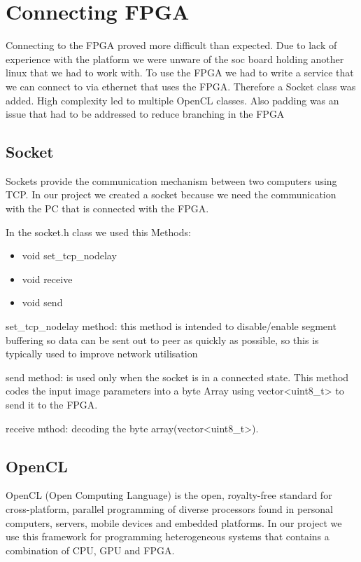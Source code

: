 \documentclass[parskip=full]{scrartcl}
\begin{document}
	
\pagebreak

\section{Connecting FPGA} \label{Connecting FPGA}

Connecting to the FPGA proved more difficult than expected. Due to lack of experience with the platform we were unware of the soc board holding another linux that we had to work with. To use the FPGA we had to write a service that we can connect to via ethernet that uses the FPGA. Therefore a Socket class was added. High complexity led to multiple OpenCL classes. Also padding was an issue that had to be addressed to reduce branching in the FPGA

\subsection{Socket}

Sockets provide the communication mechanism between two computers using TCP. In our project we created a socket because we need the communication with the PC that is connected with the FPGA. 

In the socket.h class we used this Methods:

\begin {itemize}
	\item void set\_tcp\_nodelay
	\item void receive
	\item void send
\end{itemize}

set\_tcp\_nodelay method: this method is intended to disable/enable segment buffering so data can be sent out to peer as quickly as possible, so this is typically used to improve network utilisation

send method:  is used only when the socket is in a connected state. This method codes the input image parameters into a byte Array using vector<uint8\_t> to send it to the FPGA.

receive mthod: decoding the byte array(vector<uint8\_t>).

\pagebreak

\subsection{OpenCL}

OpenCL (Open Computing Language) is the open, royalty-free standard for cross-platform, parallel programming of diverse processors found in personal computers, servers, mobile devices and embedded platforms. In our project we use this framework for programming heterogeneous systems that contains a combination of CPU, GPU and FPGA.
\end{document}
